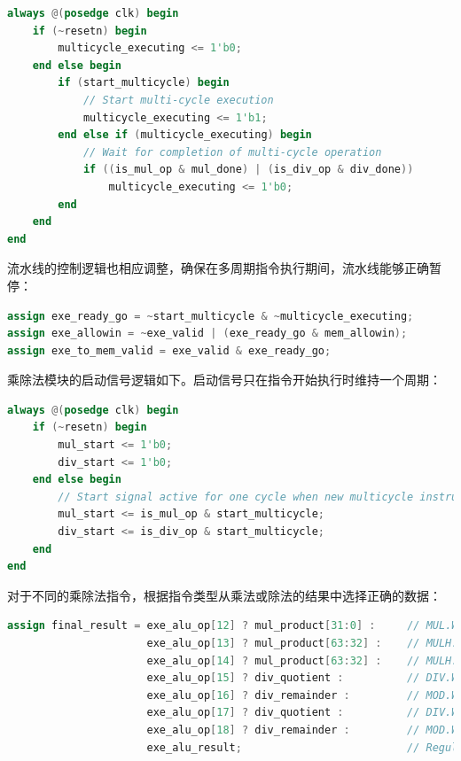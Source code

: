 \documentclass[11pt]{article}
\begin{document}
\begin{lstlisting}[language=verilog]
always @(posedge clk) begin
    if (~resetn) begin
        multicycle_executing <= 1'b0;
    end else begin
        if (start_multicycle) begin
            // Start multi-cycle execution
            multicycle_executing <= 1'b1;
        end else if (multicycle_executing) begin
            // Wait for completion of multi-cycle operation
            if ((is_mul_op & mul_done) | (is_div_op & div_done))
                multicycle_executing <= 1'b0;
        end
    end
end
\end{lstlisting}

流水线的控制逻辑也相应调整，确保在多周期指令执行期间，流水线能够正确暂停：

\begin{lstlisting}[language=verilog]
assign exe_ready_go = ~start_multicycle & ~multicycle_executing;
assign exe_allowin = ~exe_valid | (exe_ready_go & mem_allowin);
assign exe_to_mem_valid = exe_valid & exe_ready_go;
\end{lstlisting}

乘除法模块的启动信号逻辑如下。启动信号只在指令开始执行时维持一个周期：

\begin{lstlisting}[language=verilog]
always @(posedge clk) begin
    if (~resetn) begin
        mul_start <= 1'b0;
        div_start <= 1'b0;
    end else begin
        // Start signal active for one cycle when new multicycle instruction arrives
        mul_start <= is_mul_op & start_multicycle;
        div_start <= is_div_op & start_multicycle;
    end
end
\end{lstlisting}

对于不同的乘除法指令，根据指令类型从乘法或除法的结果中选择正确的数据：

\begin{lstlisting}[language=verilog]
assign final_result = exe_alu_op[12] ? mul_product[31:0] :     // MUL.W: low 32 bits
                      exe_alu_op[13] ? mul_product[63:32] :    // MULH.W: high 32 bits (signed)
                      exe_alu_op[14] ? mul_product[63:32] :    // MULH.WU: high 32 bits (unsigned)
                      exe_alu_op[15] ? div_quotient :          // DIV.W: quotient (signed)
                      exe_alu_op[16] ? div_remainder :         // MOD.W: remainder (signed)
                      exe_alu_op[17] ? div_quotient :          // DIV.WU: quotient (unsigned)
                      exe_alu_op[18] ? div_remainder :         // MOD.WU: remainder (unsigned)
                      exe_alu_result;                          // Regular ALU result
\end{lstlisting}
\end{document}
